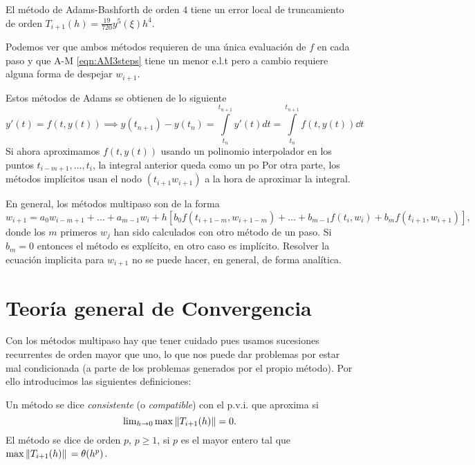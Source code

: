 \begin{proposition}
    El método de Adams-Bashforth de orden $4$
    tiene un error local de truncamiento
    de orden $T_{i+1}(h) = \frac{19}{720}y^5(\xi)h^4$.
\end{proposition}

Podemos ver que ambos métodos requieren de una única evaluación de $f$
en cada paso y que A-M \ref{eqn:AM3steps} tiene un menor e.l.t pero a cambio
requiere alguna forma de despejar $w_{i+1}$.

\begin{remark}
    Estos métodos de Adams se obtienen de lo siguiente
    \begin{equation*}
        y'(t) = f(t,y(t)) \implies
        y(t_{n+1}) - y(t_n) =
        \int\limits_{t_n}^{t_{n+1}} y'(t)dt =
        \int\limits_{t_n}^{t_{n+1}} f(t,y(t)) \dd t
    \end{equation*}
    Si ahora aproximamos $f(t,y(t))$ usando un polinomio interpolador
    en los puntos $t_{i-m+1},\dots,t_i$,
    la integral anterior queda como un po
    Por otra parte, los métodos implícitos usan el nodo $(t_{i+1}w_{i+1})$
    a la hora de aproximar la integral.
\end{remark}

En general, los métodos multipaso son de la forma
\begin{equation*}
    w_{i+1} = a_0w_{i-m+1} + \dots + a_{m-1}w_i + h[
        b_0f(t_{i+1-m},w_{i+1-m}) + \dots + b_{m-1}f(t_i,w_i)
        + b_mf(t_{i+1},w_{i+1})
    ],
\end{equation*}
donde los $m$ primeros $w_j$ han sido calculados con otro método de un paso.
Si $b_m = 0$ entonces el método es explícito, en otro caso es implícito.
Resolver la ecuación implicita para $w_{i+1}$ no se puede hacer, en general,
de forma analítica.

\section{Teoría general de Convergencia}

Con los métodos multipaso hay que tener cuidado pues usamos
sucesiones recurrentes de orden mayor que uno,
lo que nos puede dar problemas por estar mal condicionada
(a parte de los problemas generados por el propio método).
Por ello introducimos las siguientes definiciones:

\begin{definition}
    Un método se dice \emph{consistente} (o \emph{compatible})
    con el p.v.i. que aproxima si
    \begin{equation*}
        \lim\nolimits_{h\to 0} \max{\norm{T_{i+1}(h)}} = 0.
	\end{equation*}
	El método se dice de orden $p$, $p \geq 1$, si $p$ es el mayor entero
	tal que $\max{\norm*{T_{i+1}(h)}} = \theta(h^p)$.
\end{definition}


